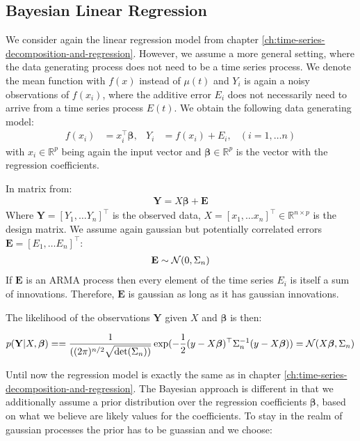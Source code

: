 \subsection{Bayesian Linear Regression}\label{subsec:bayesian-linear-regression}
We consider again the linear regression model from chapter \ref{ch:time-series-decomposition-and-regression}.
However, we assume a more general setting, where the data generating process does not need to be a time series process.
We denote the mean function with $f(x)$ instead of $\mu(t)$ and $Y_i$ is again a noisy observations of
$f(x_i)$, where the additive error $E_i$ does not necessarily need to arrive from a time series process $E(t)$.
We obtain the following data generating model:
\begin{align*}
    f(x_i) &= x_i^{\top}\boldsymbol{\beta}, & Y_i &= f(x_i) + E_i,  & (i = 1, \dots n)
\end{align*}
with $x_i \in \mathbb{R}^p$ being again the input vector and $\boldsymbol{\beta} \in \mathbb{R}^p$ is the vector with
the regression coefficients.

In matrix from:
\begin{align*}
    \mathbf{Y} = X \boldsymbol{\beta} + \mathbf{E}
\end{align*}
Where $\mathbf{Y} = [Y_{1}, \dots Y_{n}]^{\top}$ is the observed data,
$X = [x_{1}, \dots x_{n}]^{\top} \in \mathbb{R}^{n \times p}$ is the design matrix.
We assume again gaussian but potentially correlated errors $\mathbf{E} = [E_{1}, \dots E_{n}]^{\top}$:
\begin{gather*}
    \mathbf{E} \sim \operatorname{\mathcal{N}}(0, \Sigma_n)
\end{gather*}
If $\mathbf{E}$ is an ARMA process then every element of the time series $E_{i}$
is itself a sum of innovations. Therefore, $\mathbf{E}$ is gaussian as long as it has
gaussian innovations.

The likelihood of the observations $\mathbf{Y}$ given $X$ and $\boldsymbol{\beta}$ is then:

\begin{gather*}
    p(\mathbf{Y}|X,\boldsymbol{\beta}) =
    = \frac{1}{( (2\pi)^{n/2} \sqrt {\det(\Sigma_n))}}
    \exp(-\frac{1}{2}(y - X\boldsymbol{\beta})^{\top} \Sigma_n^{-1}(y-X\boldsymbol{\beta}))
    = \operatorname{\mathcal{N}}(X \boldsymbol{\beta}, \Sigma_n)
\end{gather*}

Until now the regression model is exactly the same as in chapter \ref{ch:time-series-decomposition-and-regression}.
The Bayesian approach is different in that we additionally assume a prior distribution over the
regression coefficients $\boldsymbol{\beta}$, based on what we believe are likely values for the coefficients.
To stay in the realm of gaussian processes the prior has to be guassian and we choose:

